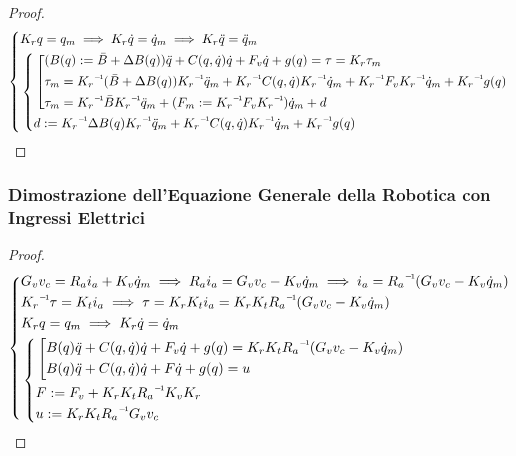 \begin{proof}

\[
	\left\{
	\begin{aligned}
	&K_rq=q_m \implies K_r\dot{q}=\dot{q}_m \implies K_r\ddot{q}=\ddot{q}_m\\
	&\left\{
	\begin{aligned}
	&\left[
	\begin{aligned}
	&(B(q) := \bar{B} + \Delta B(q))\ddot{q} + C(q,\dot{q})\dot{q} + F_v\dot{q} + g(q) = \tau = K_r\tau_m\\
	&\tau_m = \inv{K_r}(\bar{B} + \Delta B(q))\inv{K_r}\ddot{q}_m + \inv{K_r}C(q,\dot{q})\inv{K_r}\dot{q}_m + \inv{K_r}F_v\inv{K_r}\dot{q}_m + \inv{K_r}g(q)\\
	&\tau_m = \inv{K_r}\bar{B}\inv{K_r}\ddot{q}_m + (F_m := \inv{K_r}F_v\inv{K_r})\dot{q}_m + d
	\end{aligned}
	\right.\\
	&d := \inv{K_r}\Delta B(q)\inv{K_r}\ddot{q}_m + \inv{K_r}C(q,\dot{q})\inv{K_r}\dot{q}_m + \inv{K_r}g(q)
	\end{aligned}
	\right.
	\end{aligned}
	\right.
\]

\end{proof} 

\subsubsection{Dimostrazione dell'Equazione Generale della Robotica con Ingressi Elettrici}

\begin{proof}

\[
	\left\{
	\begin{aligned}
	&G_vv_c = R_ai_a + K_v\dot{q}_m \implies R_ai_a = G_vv_c - K_v\dot{q}_m \implies i_a=\inv{R_a}(G_vv_c - K_v\dot{q}_m)\\
	&\inv{K_r}\tau = K_ti_a \implies \tau = K_rK_ti_a = K_rK_t\inv{R_a}(G_vv_c - K_v\dot{q}_m)\\
	&K_rq=q_m \implies K_r\dot{q} = \dot{q}_m\\
	&\left\{
	\begin{aligned}
	&\left[
	\begin{aligned}
	&B(q)\ddot{q} + C(q,\dot{q})\dot{q} + F_v\dot{q} + g(q) = K_rK_t\inv{R_a}(G_vv_c - K_v\dot{q}_m)\\
	&B(q)\ddot{q} + C(q,\dot{q})\dot{q} + F\dot{q} + g(q) = u
	\end{aligned}
	\right.\\
	&F := F_v + K_rK_t\inv{R_a}K_vK_r\\
	&u := K_rK_t\inv{R_a}G_vv_c
	\end{aligned}
	\right.
	\end{aligned}
	\right.
\]

\end{proof}

